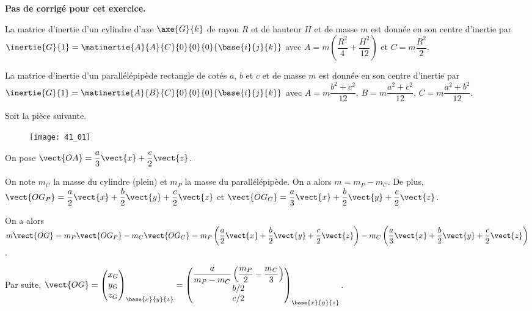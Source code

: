 \normaltrue \difficilefalse \tdifficilefalse
\correctiontrue


\setcounter{question}{0}
\ifcorrection
\else
\textbf{Pas de corrigé pour cet exercice.}
\fi

\ifprof
\else
La matrice d'inertie d'un cylindre d'axe $\axe{G}{k}$ de rayon $R$ et de hauteur $H$ et de masse $m$ est donnée en son centre d'inertie par 
$\inertie{G}{1}=\matinertie{A}{A}{C}{0}{0}{0}{\base{i}{j}{k}}$ avec $A=m\left(\dfrac{R^2}{4}+\dfrac{H^2}{12} \right)$ et $C=m\dfrac{R^2}{2}$. 


La matrice d'inertie d'un parallélépipède rectangle de cotés $a$, $b$ et $c$ et de masse $m$ est donnée en son centre d'inertie par 
$\inertie{G}{1}=\matinertie{A}{B}{C}{0}{0}{0}{\base{i}{j}{k}}$ avec $A={m\dfrac{b^2+c^2}{12}}$, $B={m\dfrac{a^2+c^2}{12}}$, $C={m\dfrac{a^2+b^2}{12}}$.

Soit la pièce suivante. 
\begin{figure}[H]
\centering
\texttt{[image: 41\_01]}
\end{figure}

On pose $\vect{OA}=\dfrac{a}{3}\vect{x}+\dfrac{c}{2}\vect{z}$. 

\fi



\ifprof
On note $m_C$ la masse du cylindre (plein) et $m_P$ la masse du parallélépipède. On a alors $m=m_P-m_C$.
De plus, $\vect{OG_P}=\dfrac{a}{2}\vect{x}+\dfrac{b}{2}\vect{y}+\dfrac{c}{2}\vect{z}$
et $\vect{OG_C}=\dfrac{a}{3}\vect{x}+\dfrac{b}{2}\vect{y}+\dfrac{c}{2}\vect{z}$.

On a alors 
$m \vect{OG}=m_P \vect{OG_P}-m_C \vect{OG_C} = m_P \left(\dfrac{a}{2}\vect{x}+\dfrac{b}{2}\vect{y}+\dfrac{c}{2}\vect{z} \right)-m_C \left( \dfrac{a}{3}\vect{x}+\dfrac{b}{2}\vect{y}+\dfrac{c}{2}\vect{z}\right) $.

Par suite, 
$\vect{OG}=
\begin{pmatrix}
x_G \\ y_G \\ z_G
\end{pmatrix}_{\base{x}{y}{z}}
=
\begin{pmatrix}
\dfrac{a}{m_P-m_C} \left( \dfrac{m_P}{2} -  \dfrac{m_C}{3}\right) \\
b/2 \\
c/2
\end{pmatrix}_{\base{x}{y}{z}}
$.
\else
\fi


